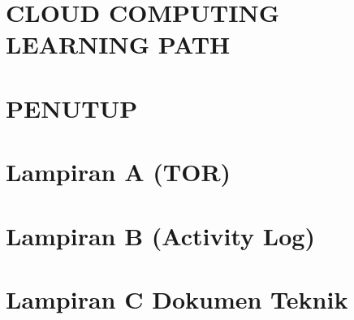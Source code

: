 \documentclass[12pt, a4paper, onecolumn, oneside, final]{report}
\begin{document}
\chapter{CLOUD COMPUTING LEARNING PATH}


\chapter{PENUTUP}



% 
\singlespacing
\renewcommand{\bibname}{Referensi} %
\newpage
\setcounter{page}{9}
\renewcommand{\thepage}{\roman{page}}


\newpage
\setcounter{page}{1}
\renewcommand{\thepage}{A-\arabic{page}}

\chapter*{Lampiran A (TOR)}


\newpage
\setcounter{page}{1}
\renewcommand{\thepage}{B-\arabic{page}}

\chapter*{Lampiran B (Activity Log)}


\newpage
\setcounter{page}{1}
\renewcommand{\thepage}{C-\arabic{page}}

\chapter*{Lampiran C Dokumen Teknik}

\end{document}
